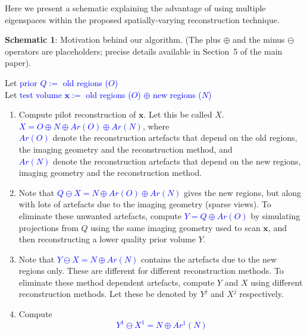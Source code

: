 \documentclass{article}
\begin{document}
Here we present a schematic explaining the advantage of using multiple eigenspaces within the
proposed spatially-varying reconstruction technique.\\


\noindent \begin{boxedminipage}{\textwidth} 
{\bf Schematic 1}: Motivation behind our algorithm. (The plus $\oplus$ and the
minus $\ominus$ operators are placeholders; precise details available
in Section~5 of the main paper). 

{\small
 Let \textcolor{blue}{prior $Q:=$ old regions ($O$)}\\
 Let \textcolor{blue}{test volume $\boldsymbol{x}:=$ old regions ($O$) $\oplus$ new regions ($N$)}\\
    \begin{enumerate}
\item  Compute pilot reconstruction of $\boldsymbol{x}$. Let this be called $X$.\\ \textcolor{blue}{$X = O \oplus N \oplus Ar(O) \oplus Ar(N)$}, where \\ \textcolor{blue}{$Ar(O)$} denote the reconstruction artefacts that depend on the old regions, the imaging geometry and the reconstruction method, and\\
 \textcolor{blue}{$Ar(N)$} denote the reconstruction artefacts that depend on the new regions, imaging geometry and the reconstruction method.
\item  Note that \textcolor{blue}{$Q \ominus X = N \oplus Ar(O) \oplus Ar(N)$} gives the new regions, but along with lots of artefacts due to the imaging geometry (sparse views). To eliminate these unwanted artefacts, compute \textcolor{blue}{$Y = Q \oplus Ar(O)$} by simulating projections from $Q$ using the same imaging geometry used to scan $\boldsymbol{x}$, and then reconstructing a lower quality prior volume $Y$. 
    \item Note that \textcolor{blue}{$Y \ominus X = N \oplus Ar(N)$} contains the artefacts due to the new regions only. These are different for different reconstruction methods. To eliminate these method dependent artefacts, compute $Y$ and $X$ using different reconstruction methods. Let these be denoted by $Y^j$ and $X^j$ respectively.
    \item Compute
\vspace{-0.2cm}
           \textcolor{blue}{\begin{equation*}
            Y^1 \ominus X^1 = N \oplus Ar^1(N)

\end{equation*}}
\end{enumerate}}
\end{boxedminipage}
\end{document}
